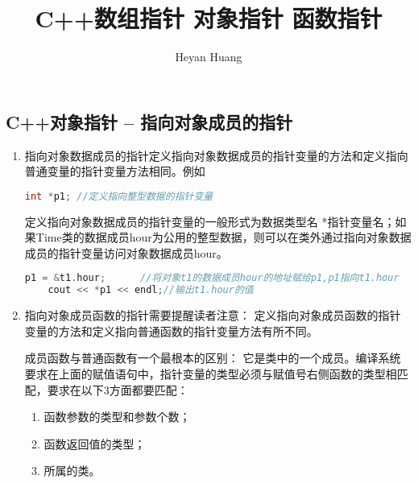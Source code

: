 \documentclass{article}
\title{C++数组指针 对象指针 函数指针}
\author{Heyan Huang}
\begin{document}
\begin{CJK}{UTF8}{gbsn}
\maketitle


\lstset{language=c++,
numbers=left, 
numberstyle=\tiny,
basicstyle=\ttfamily\small,
tabsize=4,
frame=none, %
escapeinside=``, 
extendedchars=false %
}

\small{}

\section{C++对象指针 -- 指向对象成员的指针}

\begin{enumerate}
\item 指向对象数据成员的指针定义指向对象数据成员的指针变量的方法和定义指向普通变量的指针变量方法相同。例如
\begin{lstlisting}[language=c++]
    int *p1; //定义指向整型数据的指针变量
\end{lstlisting}
  定义指向对象数据成员的指针变量的一般形式为数据类型名 *指针变量名；如果Time类的数据成员hour为公用的整型数据，则可以在类外通过指向对象数据成员的指针变量访问对象数据成员hour。
\begin{lstlisting}[language=c++]
    p1 = &t1.hour;      //将对象t1的数据成员hour的地址赋给p1,p1指向t1.hour
    cout << *p1 << endl;//输出t1.hour的值
\end{lstlisting}

\item 指向对象成员函数的指针需要提醒读者注意： 定义指向对象成员函数的指针变量的方法和定义指向普通函数的指针变量方法有所不同。
  
  成员函数与普通函数有一个最根本的区别： 它是类中的一个成员。编译系统要求在上面的赋值语句中，指针变量的类型必须与赋值号右侧函数的类型相匹配，要求在以下3方面都要匹配：
  \begin{enumerate}
    \itemsep=-3pt
  \item 函数参数的类型和参数个数；
  \item 函数返回值的类型；
  \item 所属的类。
  \end{enumerate}


\end{enumerate}
\end{CJK}
\end{document}
